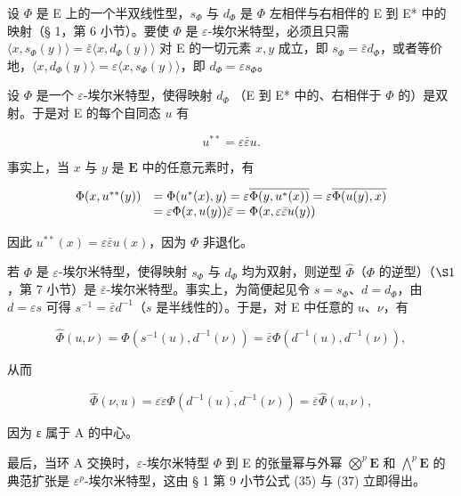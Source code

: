 设 \(\Phi\) 是 E 上的一个半双线性型，\(s_{\Phi}\) 与 \(d_{\Phi}\) 是 \(\Phi\) 左相伴与右相伴的 E 到 E* 中的映射（§ 1，第 6 小节）。要使 \(\Phi\) 是 \(\varepsilon\)-埃尔米特型，必须且只需 \(\langle x, s_{\Phi}(y) \rangle = \bar{\varepsilon} \langle x, d_{\Phi}(y) \rangle\) 对 E 的一切元素 \(x, y\) 成立，即 \(s_{\Phi} = \bar{\varepsilon} d_{\Phi}\)，或者等价地，\(\langle x, d_{\Phi}(y) \rangle = \varepsilon \langle x, s_{\Phi}(y) \rangle\)，即 \(d_{\Phi} = \varepsilon s_{\Phi}\)。

设 \(\Phi\) 是一个 \(\varepsilon\)-埃尔米特型，使得映射 \(d_{\Phi}\) （E 到 E* 中的、右相伴于 \(\Phi\) 的）是双射。于是对 E 的每个自同态 \(u\) 有

\[
u ^ {* *} = \varepsilon \bar {\varepsilon} u.\tag{1}
\]

事实上，当 \(x\) 与 \(y\) 是 \(\mathbf{E}\) 中的任意元素时，有

\[
\begin{array}{r l} \Phi (x, u ^ {* *} (y)) & = \Phi (u ^ {*} (x), y) = \varepsilon \overline {{\Phi (y , u ^ {*} (x))}} = \varepsilon \overline {{\Phi (u (y) , x)}} \\ & = \varepsilon \Phi (x, u (y)) \bar {\varepsilon} = \Phi (x, \varepsilon \bar {\varepsilon} u (y)) \end{array}
\]

因此 \(u^{**}(x) = \varepsilon \bar{\varepsilon} u(x)\)，因为 \(\Phi\) 非退化。

若 \(\Phi\) 是 \(\varepsilon\)-埃尔米特型，使得映射 \(s_{\Phi}\) 与 \(d_{\Phi}\) 均为双射，则逆型 \(\hat{\Phi}\)（\(\Phi\) 的逆型）（\(\S 1\)，第 7 小节）是 \(\bar{\varepsilon}\)-埃尔米特型。事实上，为简便起见令 \(s = s_{\Phi}\)、\(d = d_{\Phi}\)，由 \(d = \varepsilon s\) 可得 \(s^{-1} = \bar{\varepsilon} d^{-1}\)（\(s\) 是半线性的）。于是，对 E 中任意的 \(u\)、\(\nu\)，有

\[
\hat {\Phi} (u, \nu) = \Phi (s ^ {- 1} (u), d ^ {- 1} (\nu)) = \bar {\varepsilon} \Phi (d ^ {- 1} (u), d ^ {- 1} (\nu)),
\]

从而

\[
\widehat {\Phi} (\nu , u) = \overline {{\varepsilon \varepsilon}} \overline {{\Phi (d ^ {- 1} (u) , d ^ {- 1} (\nu))}} = \overline {{\varepsilon}} \widehat {\Phi} (u, \nu),
\]

因为 ε 属于 A 的中心。

最后，当环 A 交换时，\(\varepsilon\)-埃尔米特型 \(\Phi\) 到 E 的张量幂与外幂 \(\bigotimes^{p}\mathbf{E}\) 和 \(\bigwedge^{p}\mathbf{E}\) 的典范扩张是 \(\varepsilon^{p}\)-埃尔米特型，这由 § 1 第 9 小节公式 (35) 与 (37) 立即得出。

